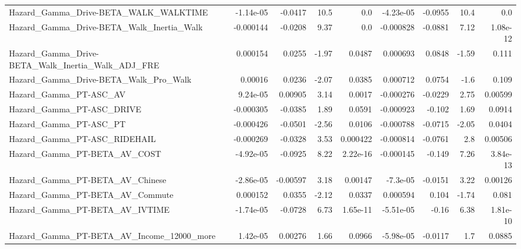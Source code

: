 \begin{tabular}{lrrrrrrrr}
Hazard\_Gamma\_Drive-BETA\_WALK\_WALKTIME              &   -1.14e-05 &      -0.0417 &     10.5 &      0.0 &  -4.23e-05 &     -0.0955 &         10.4 &           0.0 \\
Hazard\_Gamma\_Drive-BETA\_Walk\_Inertia\_Walk          &   -0.000144 &      -0.0208 &     9.37 &      0.0 &  -0.000828 &     -0.0881 &         7.12 &      1.08e-12 \\
Hazard\_Gamma\_Drive-BETA\_Walk\_Inertia\_Walk\_ADJ\_FRE  &    0.000154 &       0.0255 &    -1.97 &   0.0487 &   0.000693 &      0.0848 &        -1.59 &         0.111 \\
Hazard\_Gamma\_Drive-BETA\_Walk\_Pro\_Walk              &     0.00016 &       0.0236 &    -2.07 &   0.0385 &   0.000712 &      0.0754 &         -1.6 &         0.109 \\
Hazard\_Gamma\_PT-ASC\_AV                             &    9.24e-05 &      0.00905 &     3.14 &   0.0017 &  -0.000276 &     -0.0229 &         2.75 &       0.00599 \\
Hazard\_Gamma\_PT-ASC\_DRIVE                          &   -0.000305 &      -0.0385 &     1.89 &   0.0591 &  -0.000923 &      -0.102 &         1.69 &        0.0914 \\
Hazard\_Gamma\_PT-ASC\_PT                             &   -0.000426 &      -0.0501 &    -2.56 &   0.0106 &  -0.000788 &     -0.0715 &        -2.05 &        0.0404 \\
Hazard\_Gamma\_PT-ASC\_RIDEHAIL                       &   -0.000269 &      -0.0328 &     3.53 & 0.000422 &  -0.000814 &     -0.0761 &          2.8 &       0.00506 \\
Hazard\_Gamma\_PT-BETA\_AV\_COST                       &   -4.92e-05 &      -0.0925 &     8.22 & 2.22e-16 &  -0.000145 &      -0.149 &         7.26 &      3.84e-13 \\
Hazard\_Gamma\_PT-BETA\_AV\_Chinese                    &   -2.86e-05 &     -0.00597 &     3.18 &  0.00147 &   -7.3e-05 &     -0.0151 &         3.22 &       0.00126 \\
Hazard\_Gamma\_PT-BETA\_AV\_Commute                    &    0.000152 &       0.0355 &    -2.12 &   0.0337 &   0.000594 &       0.104 &        -1.74 &         0.081 \\
Hazard\_Gamma\_PT-BETA\_AV\_IVTIME                     &   -1.74e-05 &      -0.0728 &     6.73 & 1.65e-11 &  -5.51e-05 &       -0.16 &         6.38 &      1.81e-10 \\
Hazard\_Gamma\_PT-BETA\_AV\_Income\_12000\_more          &    1.42e-05 &      0.00276 &     1.66 &   0.0966 &  -5.98e-05 &     -0.0117 &          1.7 &        0.0885 \\

\end{tabular}
